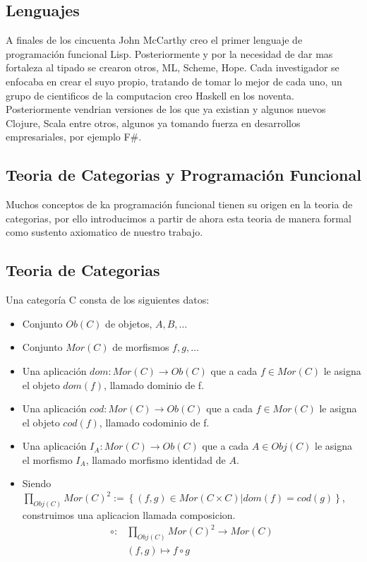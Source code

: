 \subsection{Lenguajes}

A finales de los cincuenta John McCarthy creo el primer lenguaje de programación funcional Lisp. Posteriormente y por la necesidad de dar mas fortaleza al tipado se crearon otros, ML, Scheme, Hope. Cada investigador se enfocaba en crear el suyo propio, tratando de tomar lo mejor de cada uno, un grupo de cientificos de la computacion creo Haskell en los noventa. Posteriormente vendrian versiones de los que ya existian y algunos nuevos Clojure, Scala entre otros, algunos ya tomando fuerza en desarrollos empresariales, por ejemplo F\#.

\subsection{Teoria de Categorias y Programación Funcional}

Muchos conceptos de ka programación funcional tienen su origen en la teoria de categorias, por ello introducimos a partir de ahora esta teoria de manera formal como sustento axiomatico de nuestro trabajo.

\subsection{Teoria de Categorias}

\begin{defn}[Categoria]
Una categoría C consta de los siguientes datos:
\begin{itemize}
\item Conjunto $Ob(C)$ de objetos, $A, B, \dots$
\item Conjunto $Mor(C)$ de morfismos $f, g, \dots$
\item Una aplicación $dom : Mor(C) \to Ob(C)$ que a cada $f \in Mor(C)$ le
asigna el objeto $dom(f)$, llamado dominio de f.
\item Una aplicación $cod : Mor(C) \to Ob(C)$ que a cada $f \in Mor(C)$ le
asigna el objeto $cod(f)$, llamado codominio de f.
\item Una aplicación $I_A : Mor(C) \to Ob(C)$ que a cada $A \in Obj(C)$ le
asigna el morfismo $I_A$, llamado morfismo identidad de $A$.
\item Siendo $\displaystyle \prod_{Obj(C)} Mor(C)^2 := \left\lbrace (f, g) \in Mor(C \times C) | dom(f)=cod(g) \right\rbrace$, construimos una aplicacion llamada composicion.
\begin{align*}
  \displaystyle \circ: & \prod_{Obj(C)} Mor(C)^2  \to Mor(C) \\
					   & (f,g) 					  \mapsto f \circ g
\end{align*}
\end{itemize}
\end{defn}

